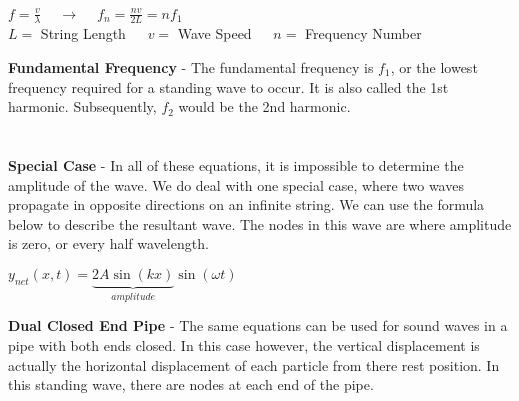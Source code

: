\documentclass{article}
\begin{document}
\begin{center}
	$f=\frac{v}{\lambda} \quad\ \longrightarrow \quad\ f_n=\frac{nv}{2L}=nf_1$\\
	\vspace{\baselineskip}
	$L=$ String Length $\:\:\:\:$ $v=$ Wave Speed $\:\:\:\:$ $n=$
	Frequency Number
\end{center}
\textbf{Fundamental Frequency} - The fundamental frequency is $f_1$, or the lowest frequency required for a standing wave to occur. It is also called the 1st harmonic. Subsequently, $f_2$ would be the 2nd harmonic.\\
\\
\\
\textbf{Special Case} - In all of these equations, it is impossible to determine the amplitude of the wave. We do deal with one special case, where two waves propagate in opposite directions on an infinite string. We can use the formula below to describe the resultant wave. The nodes in this wave are where amplitude is zero, or every half wavelength. \\
\begin{center}
	$y_{net}\left(x,t\right)=\underbrace{2A\sin\left(kx\right)}_{amplitude}\sin\left(\omega t\right)$
\end{center}
\vspace{\baselineskip}
\textbf{Dual Closed End Pipe} - The same equations can be used for sound waves in a pipe with both ends closed. In this case however, the vertical displacement is actually the horizontal displacement of each particle from there rest position. In this standing wave, there are nodes at each end of the pipe.
\begin{center}

	\hspace*{-8pt}	
\end{center}
\end{document}
